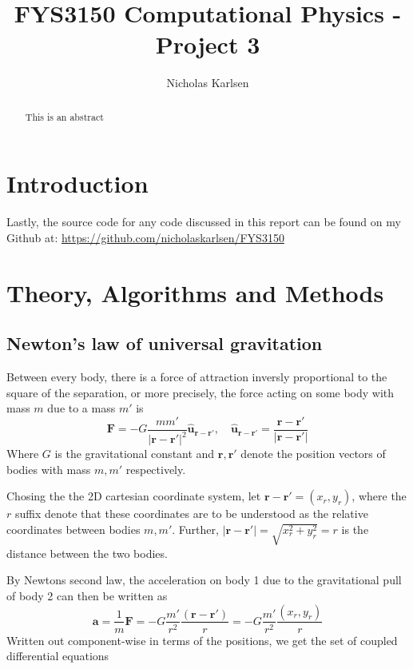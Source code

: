 \documentclass[10pt,showpacs,preprintnumbers,footinbib,amsmath,amssymb,aps,prl,twocolumn,groupedaddress,superscriptaddress,showkeys]{revtex4-1}
\begin{document}
\title{FYS3150 Computational Physics - Project 3}
\author{Nicholas Karlsen}

\begin{abstract}
This is an abstract
\end{abstract}

\maketitle

\section{Introduction}
  
  Lastly, the source code for any code discussed in this report can be found on my
  Github at: \url{https://github.com/nicholaskarlsen/FYS3150}

\section{Theory, Algorithms and Methods}
  
  \subsection{Newton's law of universal gravitation}
    Between every body, there is a force of attraction inversly proportional to the square of the separation, or more precisely, the force acting on some body with mass $m$ due to a mass $m'$ is
    \begin{equation}
      \mathbf F = -G\frac{m m'}{|\mathbf r - \mathbf r'|^2}\mathbf{\hat{u}_{r-r'}}, \quad \mathbf{\hat{u}_{r-r'}} = \frac{\mathbf r - \mathbf r'}{\mathbf |\mathbf r - \mathbf r'|}
    \end{equation}
    Where $G$ is the gravitational constant and $\mathbf r, \mathbf r'$ denote the position vectors of bodies with mass $m, m'$ respectively.

    Chosing the the 2D cartesian coordinate system, let $\mathbf r - \mathbf r'= (x_{r}, y_{r})$, where the $r$ suffix denote that these coordinates are to be understood as the relative coordinates between bodies $m, m'$.
    Further, $|\mathbf r - \mathbf r'| = \sqrt{x_r^2 + y_r^2} = r$ is the distance between the two bodies.

    By Newtons second law, the acceleration on body 1 due to the gravitational pull of body 2 can then be written as
    \begin{equation}
      \mathbf a = \frac{1}{m}\mathbf F = -G \frac{m'}{r^2}\frac{(\mathbf r-\mathbf r')}{r} = -G\frac{m'}{r^2}\frac{\left(x_r, y_r\right)}{r}
    \end{equation}
    Written out component-wise in terms of the positions, we get the set of coupled differential equations
\end{document}
